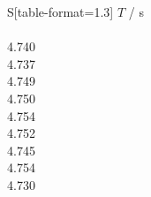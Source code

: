 \begin{subtable}{0.18\textwidth}
\centering
{}
\label{tab:magnet4-0}
\begin{tabular}{S[table-format=1.3]}
\toprule
{$T$ / s} \\
 \\
4.740 \\
4.737 \\
4.749 \\
4.750 \\
4.754 \\
4.752 \\
4.745 \\
4.754 \\
4.730 \\
\bottomrule
\end{tabular}
\end{subtable}